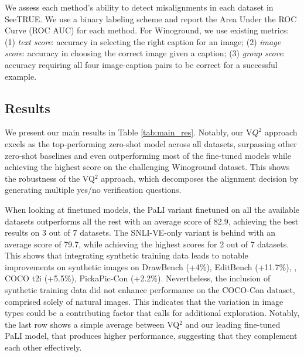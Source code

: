 \documentclass{article}
\newcommand{\datasetname}[0]{SeeTRUE\xspace}
\newcommand{\VQSQR}[0]{VQ$^2$\xspace}
\begin{document}
We assess each method's ability to detect misalignments in each dataset in \datasetname. We use a binary labeling scheme and report the Area Under the ROC Curve (ROC AUC) for each method. For Winoground, we use existing metrics: (1) \textit{text score}: accuracy in selecting the right caption for an image; (2) \textit{image score}: accuracy in choosing the correct image given a caption; (3) \textit{group score}: accuracy requiring all four image-caption pairs to be correct for a successful example.

\subsection{Results}

We present our main results in Table \ref{tab:main_res}. Notably, our V$Q^2$ approach excels as the top-performing zero-shot model across all datasets, surpassing other zero-shot baselines and even outperforming most of the fine-tuned models while achieving the highest score on the challenging Winoground dataset. This shows the robustness of the \VQSQR approach, which decomposes the alignment decision by generating multiple yes/no verification questions.

When looking at finetuned models, the PaLI variant finetuned on all the available datasets outperforms all the rest with an average score of 82.9, achieving the best results on 3 out of 7 datasets. The SNLI-VE-only variant is behind with an average score of 79.7, while achieving the highest scores for 2 out of 7 datasets. This shows that integrating synthetic training data leads to notable improvements on synthetic images on DrawBench (+4\%), EditBench (+11.7\%), , COCO t2i (+5.5\%), PickaPic-Con (+2.2\%). Nevertheless, the inclusion of synthetic training data did not enhance performance on the COCO-Con dataset, comprised solely of natural images. This indicates that the variation in image types could be a contributing factor that calls for additional exploration. Notably, the last row shows a simple average between \VQSQR and our leading fine-tuned PaLI model, that produces higher performance, suggesting that they complement each other effectively.
\end{document}
